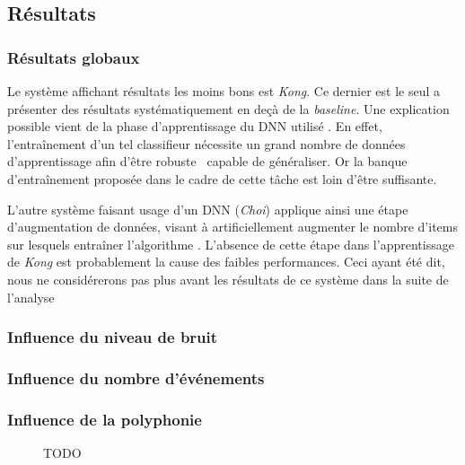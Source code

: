 \subsection{Résultats}

\subsubsection{Résultats globaux}

Le système affichant résultats les moins bons est \emph{Kong}. Ce dernier est le seul a présenter des résultats systématiquement en deçà de la \emph{baseline}. Une explication possible vient de la phase d'apprentissage du DNN utilisé \citep{Kong2016}. En effet, l’entraînement d'un tel classifieur nécessite un grand nombre de données d'apprentissage afin d'être robuste \ie~capable de généraliser. Or la banque d'entraînement proposée dans le cadre de cette tâche est loin d'être suffisante. 

L'autre système faisant usage d'un DNN (\emph{Choi}) applique ainsi une étape d'augmentation de données, visant à artificiellement augmenter le nombre d'items sur lesquels entraîner l'algorithme \citep{Choi2016}. L'absence de cette étape dans l'apprentissage de \emph{Kong} est probablement la cause des faibles performances. Ceci ayant été dit, nous ne considérerons pas plus avant les résultats de ce système dans la suite de l'analyse

\subsubsection{Influence du niveau de bruit}

\subsubsection{Influence du nombre d'événements}

\subsubsection{Influence de la polyphonie}



\begin{figure}[t]
        \myfloatalign
        \par
        \par
       \caption[TODO]{TODO}\label{fig:dcase2016_poly1_eb_fc}
\end{figure}

